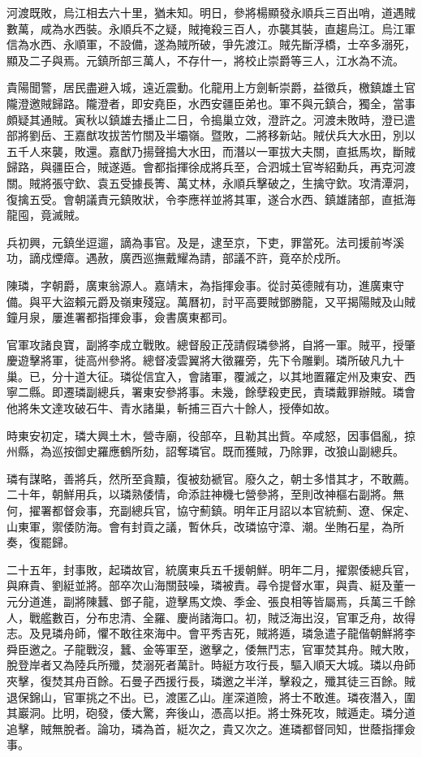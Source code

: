 \begin{pinyinscope}
河渡既敗，烏江相去六十里，猶未知。明日，參將楊顯發永順兵三百出哨，道遇賊數萬，咸為水西裝。永順兵不之疑，賊掩殺三百人，亦襲其裝，直趨烏江。烏江軍信為水西、永順軍，不設備，遂為賊所破，爭先渡江。賊先斷浮橋，士卒多溺死，顯及二子與焉。元鎮所部三萬人，不存什一，將校止崇爵等三人，江水為不流。

貴陽聞警，居民盡避入城，遠近震動。化龍用上方劍斬崇爵，益徵兵，檄鎮雄土官隴澄邀賊歸路。隴澄者，即安堯臣，水西安疆臣弟也。軍不與元鎮合，獨全，當事頗疑其通賊。寅秋以鎮雄去播止二日，令搗巢立效，澄許之。河渡未敗時，澄已遣部將劉岳、王嘉猷攻拔苦竹關及半壩嶺。暨敗，二將移新站。賊伏兵大水田，別以五千人來襲，敗還。嘉猷乃揚聲搗大水田，而潛以一軍拔大夫關，直抵馬坎，斷賊歸路，與疆臣合，賊遂遁。會都指揮徐成將兵至，合泗城土官岑紹勳兵，再克河渡關。賊將張守欽、袁五受據長箐、萬丈林，永順兵擊破之，生擒守欽。攻清潭洞，復擒五受。會朝議責元鎮敗狀，令李應祥並將其軍，遂合水西、鎮雄諸部，直抵海龍囤，竟滅賊。

兵初興，元鎮坐逗遛，謫為事官。及是，逮至京，下吏，罪當死。法司援前岑溪功，謫戍煙瘴。遇赦，廣西巡撫戴耀為請，部議不許，竟卒於戍所。

陳璘，字朝爵，廣東翁源人。嘉靖末，為指揮僉事。從討英德賊有功，進廣東守備。與平大盜賴元爵及嶺東殘寇。萬曆初，討平高要賊鄧勝龍，又平揭陽賊及山賊鐘月泉，屢進署都指揮僉事，僉書廣東都司。

官軍攻諸良寶，副將李成立戰敗。總督殷正茂請假璘參將，自將一軍。賊平，授肇慶遊擊將軍，徙高州參將。總督凌雲翼將大徵羅旁，先下令雕剿。璘所破凡九十巢。已，分十道大征。璘從信宜入，會諸軍，覆滅之，以其地置羅定州及東安、西寧二縣。即遷璘副總兵，署東安參將事。未幾，餘孽殺吏民，責璘戴罪辦賊。璘會他將朱文達攻破石牛、青水諸巢，斬捕三百六十餘人，授俸如故。

時東安初定，璘大興土木，營寺廟，役部卒，且勒其出貲。卒咸怒，因事倡亂，掠州縣，為巡按御史羅應鶴所劾，詔奪璘官。既而獲賊，乃除罪，改狼山副總兵。

璘有謀略，善將兵，然所至貪黷，復被劾褫官。廢久之，朝士多惜其才，不敢薦。二十年，朝鮮用兵，以璘熟倭情，命添註神機七營參將，至則改神樞右副將。無何，擢署都督僉事，充副總兵官，協守薊鎮。明年正月詔以本官統薊、遼、保定、山東軍，禦倭防海。會有封貢之議，暫休兵，改璘協守漳、潮。坐賄石星，為所奏，復罷歸。

二十五年，封事敗，起璘故官，統廣東兵五千援朝鮮。明年二月，擢禦倭總兵官，與麻貴、劉綎並將。部卒次山海關鼓噪，璘被責。尋令提督水軍，與貴、綎及董一元分道進，副將陳蠶、鄧子龍，遊擊馬文煥、季金、張良相等皆屬焉，兵萬三千餘人，戰艦數百，分布忠清、全羅、慶尚諸海口。初，賊泛海出沒，官軍乏舟，故得志。及見璘舟師，懼不敢往來海中。會平秀吉死，賊將遁，璘急遣子龍偕朝鮮將李舜臣邀之。子龍戰沒，蠶、金等軍至，邀擊之，倭無鬥志，官軍焚其舟。賊大敗，脫登岸者又為陸兵所殲，焚溺死者萬計。時綎方攻行長，驅入順天大城。璘以舟師夾擊，復焚其舟百餘。石曼子西援行長，璘邀之半洋，擊殺之，殲其徒三百餘。賊退保錦山，官軍挑之不出。已，渡匿乙山。崖深道險，將士不敢進。璘夜潛入，圍其巖洞。比明，砲發，倭大驚，奔後山，憑高以拒。將士殊死攻，賊遁走。璘分道追擊，賊無脫者。論功，璘為首，綎次之，貴又次之。進璘都督同知，世蔭指揮僉事。


\end{pinyinscope}
